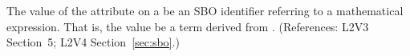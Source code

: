 The value of the  attribute on a \Trigger {} be an SBO
identifier referring to a mathematical expression.  That is, the value
 be a term derived from \sbomathformula.  (References: 
L2V3 Section~5; L2V4 Section~\ref{sec:sbo}.)
